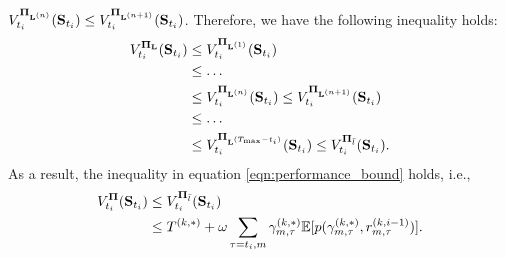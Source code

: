 $V^{\mathbf{\Pi}_{\mathbf{L}^{(n)}}}_{t_i}( \mathbf{S}_{t_i} ) \leq V^{\mathbf{\Pi}_{\mathbf{L}^{(n+1)}}}_{t_i}( \mathbf{S}_{t_i} )$.
Therefore, we have the following inequality holds:
\begin{align*}
    V^{\mathbf{\Pi}_{\mathbf{L}}}_{t_i}( \mathbf{S}_{t_i} ) &\leq V^{\mathbf{\Pi}_{\mathbf{L}^{(1)}}}_{t_i}( \mathbf{S}_{t_i} )
    \nonumber\\
    &\leq \dots
    \nonumber\\
    &\leq
    V^{\mathbf{\Pi}_{\mathbf{L}^{(n)}}}_{t_i}( \mathbf{S}_{t_i} ) \leq
    V^{\mathbf{\Pi}_{\mathbf{L}^{(n+1)}}}_{t_i}( \mathbf{S}_{t_i} )
    \nonumber\\
    &\leq \dots
    \nonumber\\
    &\leq V^{\mathbf{\Pi}_{\mathbf{L}^{({T_{\max}}-t_i)}}}_{t_i}( \mathbf{S}_{t_i} ) \leq V^{\mathbf{\Pi}_{\bar{l}}}_{t_i}( \mathbf{S}_{t_i} ).
\end{align*}
As a result, the inequality in equation \eqref{eqn:performance_bound} holds, i.e.,
\begin{align*}
    V^{\mathbf{\Pi}}_{t_i}( \mathbf{S}_{t_i} ) &\leq V^{\mathbf{\Pi}_{\bar{l}}}_{t_i}( \mathbf{S}_{t_i} )
    \nonumber\\
    &\leq T^{(k,*)} + \omega \sum_{\tau=t_i, m} \gamma^{(k,*)}_{m,\tau} \mathbb{E}[ p( \gamma^{(k,*)}_{m,\tau}, r^{(k,i-1)}_{m,\tau} ) ].
\end{align*}
